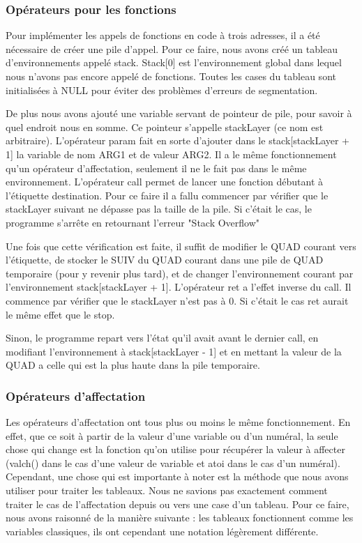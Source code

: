 \documentclass{article}
\begin{document}
\subsubsection{Opérateurs pour les fonctions}

Pour implémenter les appels de fonctions en code à trois adresses, il a été nécessaire de créer une pile d'appel.
Pour ce faire, nous avons créé un tableau d'environnements appelé stack. Stack[0] est l'environnement global dans lequel nous n'avons pas encore appelé de fonctions.
Toutes les cases du tableau sont initialisées à NULL pour éviter des problèmes d'erreurs de segmentation.

De plus nous avons ajouté une variable servant de pointeur de pile, pour savoir à quel endroit nous en somme. Ce pointeur s'appelle stackLayer (ce nom est arbitraire).
\bigbreak
L'opérateur param fait en sorte d'ajouter dans le stack[stackLayer + 1] la variable de nom ARG1 et de valeur ARG2. Il a le même fonctionnement qu'un opérateur d'affectation, seulement il ne le fait pas dans le même environnement.
\medbreak
L'opérateur call permet de lancer une fonction débutant à l'étiquette destination. Pour ce faire il a fallu commencer par vérifier que le stackLayer suivant ne dépasse pas la taille de la pile.
Si c'était le cas, le programme s'arrête en retournant l'erreur "Stack Overflow"

Une fois que cette vérification est faite, il suffit de modifier le QUAD courant vers l'étiquette, de stocker le SUIV du QUAD courant dans une pile de QUAD temporaire (pour y revenir plus tard), et de changer l'environnement courant par l'environnement stack[stackLayer + 1].
\medbreak
L'opérateur ret a l'effet inverse du call. Il commence par vérifier que le stackLayer n'est pas à 0. Si c'était le cas ret aurait le même effet que le stop.

Sinon, le programme repart vers l'état qu'il avait avant le dernier call, en modifiant l'environnement à stack[stackLayer - 1] et en mettant la valeur de la QUAD a celle qui est la plus haute dans la pile temporaire.

\subsubsection{Opérateurs d'affectation}

Les opérateurs d'affectation ont tous plus ou moins le même fonctionnement. En effet, que ce soit à partir de la valeur d'une variable ou d'un numéral, la seule chose qui change est la fonction qu'on utilise pour récupérer la valeur à affecter (valch() dans le cas d'une valeur de variable et atoi dans le cas d'un numéral).
Cependant, une chose qui est importante à noter est la méthode que nous avons utiliser pour traiter les tableaux.
\medbreak
Nous ne savions pas exactement comment traiter le cas de l'affectation depuis ou vers une case d'un tableau.
Pour ce faire, nous avons raisonné de la manière suivante : les tableaux fonctionnent comme les variables classiques, ils ont cependant une notation légèrement différente.
\end{document}
